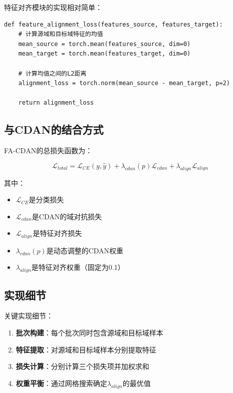 \documentclass[12pt,a4paper]{ctexart}
\begin{document}
特征对齐模块的实现相对简单：

\begin{verbatim}
def feature_alignment_loss(features_source, features_target):
    # 计算源域和目标域特征的均值
    mean_source = torch.mean(features_source, dim=0)
    mean_target = torch.mean(features_target, dim=0)
    
    # 计算均值之间的L2距离
    alignment_loss = torch.norm(mean_source - mean_target, p=2)
    
    return alignment_loss
\end{verbatim}

\subsection{与CDAN的结合方式}

FA-CDAN的总损失函数为：

\begin{equation}
\mathcal{L}_{total} = \mathcal{L}_{CE}(y, \hat{y}) + \lambda_{cdan}(p) \mathcal{L}_{cdan} + \lambda_{align} \mathcal{L}_{align}
\end{equation}

其中：
\begin{itemize}
    \item $\mathcal{L}_{CE}$是分类损失
    \item $\mathcal{L}_{cdan}$是CDAN的域对抗损失
    \item $\mathcal{L}_{align}$是特征对齐损失
    \item $\lambda_{cdan}(p)$是动态调整的CDAN权重
    \item $\lambda_{align}$是特征对齐权重（固定为0.1）
\end{itemize}

\subsection{实现细节}

关键实现细节：

\begin{enumerate}
    \item \textbf{批次构建}：每个批次同时包含源域和目标域样本
    \item \textbf{特征提取}：对源域和目标域样本分别提取特征
    \item \textbf{损失计算}：分别计算三个损失项并加权求和
    \item \textbf{权重平衡}：通过网格搜索确定$\lambda_{align}$的最优值
\end{enumerate}
\end{document}
